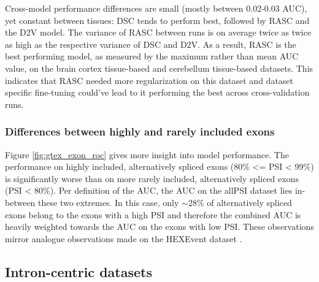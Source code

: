 Cross-model performance differences are small (mostly between 0.02-0.03 AUC), yet constant between tissues: DSC tends to perform best, followed by RASC and the D2V model. The variance of RASC between runs is on average twice as twice as high as the respective variance of DSC and D2V. As a result, RASC is the best performing model, as measured by the maximum rather than mean AUC value, on the brain cortex tissue-based and cerebellum tissue-based datasets. This indicates that RASC needed more regularization on this dataset and dataset specific fine-tuning could've lead to it performing the best across cross-validation runs.

\subsubsection{Differences between highly and rarely included exons}
Figure \ref{fig:gtex_exon_roc} gives more insight into model performance. 
The performance on highly included, alternatively spliced exons (80\% <= PSI < 99\%) is significantly worse than on more rarely included, alternatively spliced exons (PSI < 80\%). Per definition of the AUC, the AUC on the allPSI dataset lies in-between these two extremes. In this case, only $\sim$28\% of alternatively spliced exons belong to the exons with a high PSI and therefore the combined AUC is heavily weighted towards the AUC on the exons with low PSI. These observations mirror analogue observations made on the HEXEvent dataset \cite{dsc}.



%	




	
	
	

\subsection{Intron-centric datasets} \label{subsec:gtex_junc}

